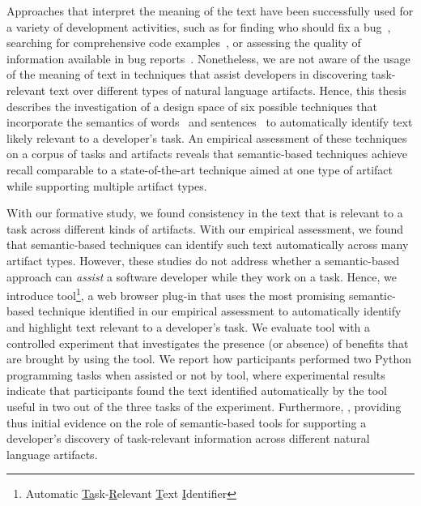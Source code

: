 Approaches that interpret the meaning of the text have been successfully used for a variety of development activities,
such as for finding who should fix a bug~\cite{yang2016}, searching for comprehensive code examples~\cite{silva2019}, or assessing the quality of information available in bug reports~\cite{chaparro2019}.
Nonetheless, we are not aware of the usage of the meaning of text in techniques 
that assist developers in discovering task-relevant text over different types of natural language artifacts.
Hence, this thesis describes the investigation of a design space
of six possible techniques that incorporate the semantics of words~\cite{Mikolov2013, Devlin2018Bert}
and sentences~\cite{fillmore1976frame, marques2021}
to automatically identify text likely relevant to a developer's task.
An empirical assessment of these techniques 
on a corpus of tasks
and artifacts reveals that semantic-based techniques
achieve recall comparable to a state-of-the-art technique aimed at one type of artifact~\cite{Xu2017}
while supporting
multiple artifact types.






With our formative study, we found consistency in the text  that is relevant to a task across different kinds of artifacts.
With our empirical assessment, we found that semantic-based techniques can identify such text
automatically across many artifact types.
However, these studies do not address whether a semantic-based approach can \textit{assist} a software developer while they work on a task.
Hence, we introduce \acs{tool}\footnote{
    Automatic \underline{Ta}sk-\underline{R}elevant \underline{T}ext \underline{I}dentifier
}, a web browser plug-in that 
uses the most promising semantic-based technique identified in our empirical assessment
to automatically identify and highlight text relevant to a developer's task.
We evaluate \acs{tool} with a controlled experiment that investigates the presence (or absence) of benefits that are brought by using the tool.
We report how  participants 
performed two Python programming tasks when 
 assisted or not by \acs{tool},
where experimental results indicate that participants found the text identified automatically
by the tool 
useful in two out of the three tasks of the experiment.
Furthermore,
, providing thus
initial evidence on the role of semantic-based tools 
for supporting a developer's discovery of task-relevant information
across different natural language artifacts.


